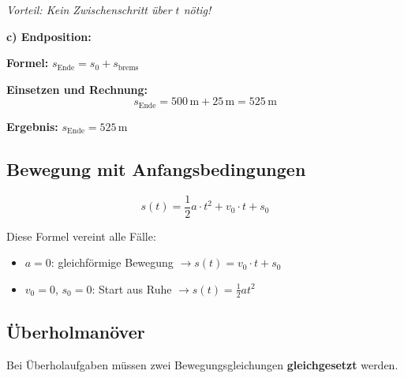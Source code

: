 \documentclass[11pt,a4paper]{article}
\begin{document}
\begin{beispiel}
\begin{tcolorbox}[colback=physikblue!5, colframe=physikblue, boxrule=0.5pt, title=\textbf{Variante B: Mit zeitloser Formel}]
\textit{Vorteil: Kein Zwischenschritt über $t$ nötig!}
\end{tcolorbox}

\vspace{0.3cm}
\textbf{c) Endposition:}

\textbf{Formel:} $s_{\text{Ende}} = s_0 + s_{\text{brems}}$

\textbf{Einsetzen und Rechnung:}
\[
s_{\text{Ende}} = 500\,\mathrm{m} + 25\,\mathrm{m} = 525\,\mathrm{m}
\]

\textbf{Ergebnis:} $\boxed{s_{\text{Ende}} = 525\,\mathrm{m}}$
\end{beispiel}

\subsection{Bewegung mit Anfangsbedingungen}

\begin{formelbox}
\[
\boxed{s(t) = \frac{1}{2} a \cdot t^2 + v_0 \cdot t + s_0}
\]

Diese Formel vereint alle Fälle:
\begin{itemize}
\item $a = 0$: gleichförmige Bewegung $\rightarrow s(t) = v_0 \cdot t + s_0$
\item $v_0 = 0$, $s_0 = 0$: Start aus Ruhe $\rightarrow s(t) = \frac{1}{2}at^2$
\end{itemize}
\end{formelbox}

\subsection{Überholmanöver}

Bei Überholaufgaben müssen zwei Bewegungsgleichungen \textbf{gleichgesetzt} werden.
\end{document}
